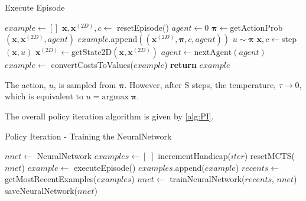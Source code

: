 \documentclass[../main.tex]{subfiles}
\begin{document}
\begin{algorithm}
   \caption{Execute Episode}
   \label{alg:executeEpisode}
   \begin{algorithmic}[1]
      \State $example \leftarrow []$
      \State $\boldsymbol{x}, \boldsymbol{x}^{(2D)}, c \leftarrow$ resetEpisode()
      \State $agent\leftarrow 0$
      \Repeat
         \State $\boldsymbol{\pi} \leftarrow $getActionProb$(\boldsymbol{x}, \boldsymbol{x}^{(2D)}, agent)$
         \State $example$.append$((\boldsymbol{x}^{(2D)}, \boldsymbol{\pi}, c, agent))$
         \State $u \sim \boldsymbol{\pi}$
         \State $\boldsymbol{x}, c \leftarrow $step$(\boldsymbol{x}, u)$
         \State $\boldsymbol{x}^{(2D)} \leftarrow $getState2D$(\boldsymbol{x}, \boldsymbol{x}^{(2D)})$
         \State $agent \leftarrow \text{nextAgent}(agent)$
      \State $example \leftarrow$ convertCostsToValues($example$)
      \State \textbf{return} $example$
      \EndFunction
   \end{algorithmic}
\end{algorithm}

The action, $u$, is sampled from $\boldsymbol{\pi}$. However, after S steps, the temperature, $\tau \rightarrow 0$, which is equivalent to  $u = \text{argmax}\;\boldsymbol{\pi}$.

The overall policy iteration algorithm is given by \cref{alg:PI}.

\begin{algorithm}
   \label{alg:PI}
   \caption{Policy Iteration - Training the NeuralNetwork}
   \begin{algorithmic}[1]
      \State $nnet \leftarrow$ NeuralNetwork
      \State $examples \leftarrow [\;]$
      \State incrementHandicap($iter$)
         \State resetMCTS($nnet$)
         \State $example \leftarrow$ executeEpisode()
         \State $examples$.append($example$)    
         \EndFor
      \State $recents \leftarrow$ getMostRecentExamples($examples$)
      \State $nnet \leftarrow$ trainNeuralNetwork($recents$, $nnet$)
      \State saveNeuralNetwork($nnet$)
      \EndFor
      \EndFunction
   \end{algorithmic}
\end{algorithm}
\end{document}
